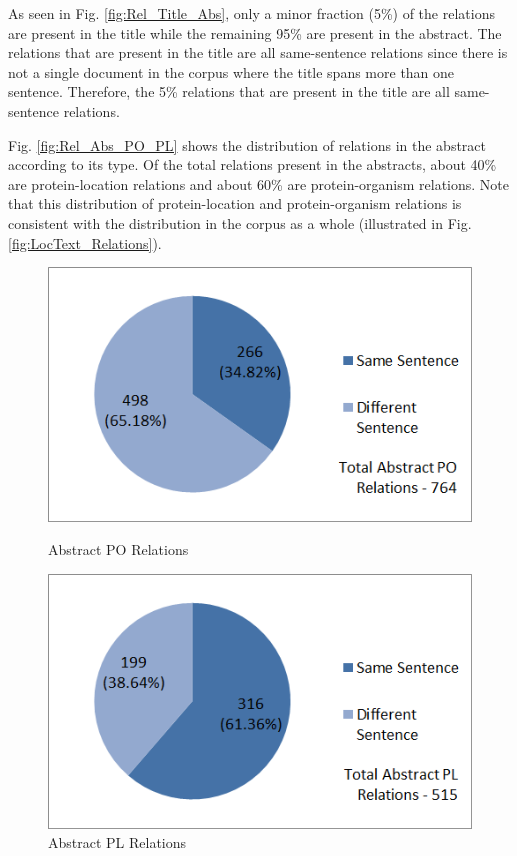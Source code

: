 As seen in Fig. \ref{fig:Rel_Title_Abs}, only a minor fraction (5\%) of the relations are present in the title while the remaining 95\% are present in the abstract. The relations that are present in the title are all same-sentence relations since there is not a single document in the corpus where the title spans more than one sentence. Therefore, the 5\% relations that are present in the title are all same-sentence relations.

Fig. \ref{fig:Rel_Abs_PO_PL} shows the distribution of relations in the abstract according to its type. Of the total relations present in the abstracts, about 40\% are protein-location relations and about 60\% are protein-organism relations. Note that this distribution of protein-location and protein-organism relations is consistent with the distribution in the corpus as a whole (illustrated in Fig. \ref{fig:LocText_Relations}).

\begin{figure}
\centering
\begin{minipage}{.5\textwidth}
  \centering
  \includegraphics[width=.95\textwidth]{figures/AbsPORels_sent_Distribution.png}
  \caption{Abstract PO Relations}
  \label{fig:Abs_PO_Rel}
\end{minipage}%
\begin{minipage}{.5\textwidth}
  \centering
  \includegraphics[width=.95\textwidth]{figures/AbsPLRels_sent_Distribution.png}
  \caption{Abstract PL Relations}
  \label{fig:Abs_PL_Rel}
\end{minipage}
\end{figure}


